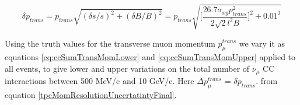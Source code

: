 \begin{equation}
\delta{p_{trans}} = p_{trans}\sqrt{ (\delta{s}/{s})^{2} +  (\delta{B}/{B})^{2} } = 
p_{trans}\sqrt{ \bigg[\frac{26.7 \sigma_{xy} p_{trans}^{2}}{2\sqrt{2}l^{2}B}\bigg]^{2} + 0.01^{2}}
\label{tpcMomResolutionUncertatintyFinal}
\end{equation}
%
%
%

Using the truth values for the transverse muon momentum $p_{\mu}^{trans}$ we vary it as equations \ref{eq:ccSumTransMomLower} and \ref{eq:ccSumTransMomUpper} applied to all events, to give lower and upper variations on the total number of $\nu_{\mu}$ CC interactions between 500 MeV/c and 10 GeV/c. Here $\Delta{p^{trans}_{\mu}}$ = $\delta{p_{trans}}$.
 from equation \ref{tpcMomResolutionUncertatintyFinal}.


